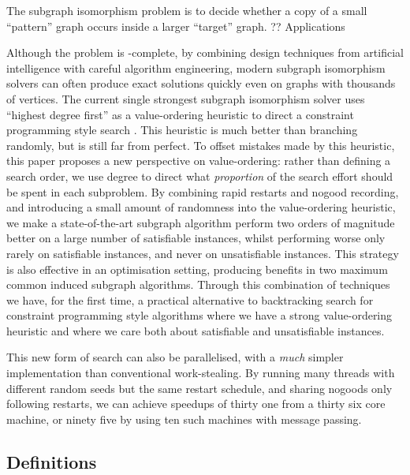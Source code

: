 \documentclass[runningheads]{llncs}
\newcommand{\neighbourhood}{\operatorname{N}}
\newcommand{\vertexset}{\operatorname{V}}
\newcommand{\citet}[2]{#1\cite{#2}}
\begin{document}
The subgraph isomorphism problem is to decide whether a copy of a small ``pattern'' graph occurs
inside a larger ``target'' graph.  ?? Applications

Although the problem is \NP-complete, by combining design techniques from artificial intelligence
with careful algorithm engineering, modern subgraph isomorphism solvers can often produce exact
solutions quickly even on graphs with thousands of vertices. The current single strongest subgraph
isomorphism solver uses ``highest degree first'' as a value-ordering heuristic to direct a
constraint programming style search
\cite{DBLP:conf/cp/McCreeshP15,DBLP:conf/lion/KotthoffMS16,DBLP:journals/jair/McCreeshPST18}. This
heuristic is much better than branching randomly, but is still far from perfect. To offset mistakes
made by this heuristic, this paper proposes a new perspective on value-ordering: rather than
defining a search order, we use degree to direct what \emph{proportion} of the search effort should
be spent in each subproblem. By combining rapid restarts and nogood recording, and introducing a
small amount of randomness into the value-ordering heuristic, we make a state-of-the-art subgraph
algorithm perform two orders of magnitude better on a large number of satisfiable instances, whilst
performing worse only rarely on satisfiable instances, and never on unsatisfiable instances.  This
strategy is also effective in an optimisation setting, producing benefits in two maximum common
induced subgraph algorithms. Through this combination of techniques we have, for the first time, a
practical alternative to backtracking search for constraint programming style algorithms where we
have a strong value-ordering heuristic and where we care both about satisfiable and unsatisfiable
instances.

This new form of search can also be parallelised, with a \emph{much} simpler implementation than
conventional work-stealing. By running many threads with different random seeds but the same restart
schedule, and sharing nogoods only following restarts, we can achieve speedups of thirty one from a
thirty six core machine, or ninety five by using ten such machines with message passing.

\subsection{Definitions}

\end{document}
